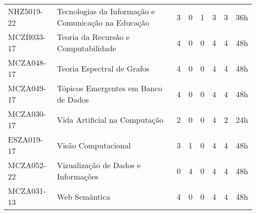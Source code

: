 \documentclass[a4paper]{article}
\begin{document}
\begin{longtable}{|l|l|llll|l|l|}
NHZ5019-22 & Tecnologias da Informação e Comunicação na Educação & 3 & 0 & 1 & 3 & 3 & 36h \\ 
MCZB033-17 & Teoria da Recursão e Computabilidade & 4 & 0 & 0 & 4 & 4 & 48h \\
MCZA048-17 & Teoria Espectral de Grafos & 4 & 0 & 0 & 4 & 4 & 48h \\
MCZA049-17 & Tópicos Emergentes em Banco de Dados & 4 & 0 & 0 & 4 & 4 & 48h \\
MCZA030-17 & Vida Artificial na Computação & 2 & 0 & 0 & 4 & 2 & 24h \\
ESZA019-17 & Visão Computacional & 3 & 1 & 0 & 4 & 4 & 48h \\
MCZA052-22 & Vizualização de Dados e Informações & 0 & 4 & 0 & 4 & 4 & 48h \\
MCZA031-13 & Web Semântica & 4 & 0 & 0 & 4 & 4 & 48h \\
\end{longtable}
\end{document}
